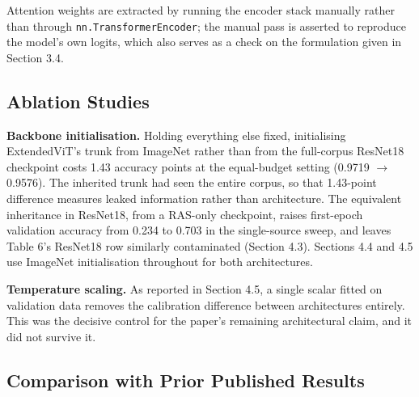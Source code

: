 Attention weights are extracted by running the encoder stack manually
rather than through \texttt{nn.TransformerEncoder}; the manual pass is
asserted to reproduce the model's own logits, which also serves as a
check on the formulation given in Section 3.4.

\hypertarget{ablation-studies}{%
\subsection{Ablation Studies}\label{ablation-studies}}

\textbf{Backbone initialisation.} Holding everything else fixed,
initialising ExtendedViT's trunk from ImageNet rather than from the
full-corpus ResNet18 checkpoint costs 1.43 accuracy points at the
equal-budget setting (0.9719 \ensuremath{\rightarrow} 0.9576). The inherited trunk had seen the
entire corpus, so that 1.43-point difference measures leaked information
rather than architecture. The equivalent inheritance in ResNet18,
from a RAS-only checkpoint, raises first-epoch validation accuracy
from 0.234 to 0.703 in the single-source sweep, and leaves Table 6's
ResNet18 row similarly contaminated (Section 4.3). Sections 4.4 and 4.5
use ImageNet initialisation throughout for both architectures.

\textbf{Temperature scaling.} As reported in Section 4.5, a single
scalar fitted on validation data removes the calibration difference
between architectures entirely. This was the decisive control for the
paper's remaining architectural claim, and it did not survive it.

\hypertarget{comparison-with-prior-published-results}{%
\subsection{Comparison with Prior Published
Results}\label{comparison-with-prior-published-results}}

